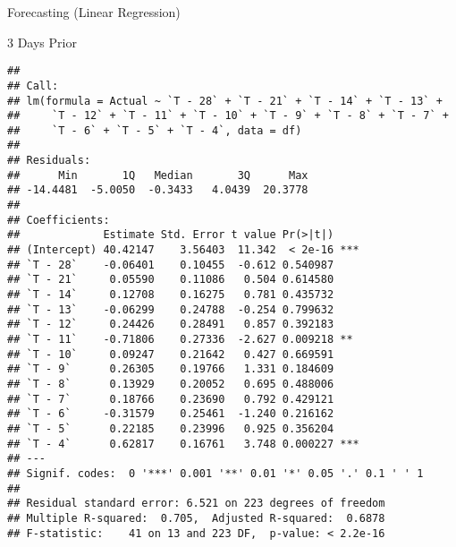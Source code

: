 \documentclass[
  ignorenonframetext,
]{beamer}
\begin{document}
\begin{frame}[fragile]{Forecasting (Linear Regression)}
\begin{block}{3 Days Prior}
\begin{verbatim}
## 
## Call:
## lm(formula = Actual ~ `T - 28` + `T - 21` + `T - 14` + `T - 13` + 
##     `T - 12` + `T - 11` + `T - 10` + `T - 9` + `T - 8` + `T - 7` + 
##     `T - 6` + `T - 5` + `T - 4`, data = df)
## 
## Residuals:
##      Min       1Q   Median       3Q      Max 
## -14.4481  -5.0050  -0.3433   4.0439  20.3778 
## 
## Coefficients:
##             Estimate Std. Error t value Pr(>|t|)    
## (Intercept) 40.42147    3.56403  11.342  < 2e-16 ***
## `T - 28`    -0.06401    0.10455  -0.612 0.540987    
## `T - 21`     0.05590    0.11086   0.504 0.614580    
## `T - 14`     0.12708    0.16275   0.781 0.435732    
## `T - 13`    -0.06299    0.24788  -0.254 0.799632    
## `T - 12`     0.24426    0.28491   0.857 0.392183    
## `T - 11`    -0.71806    0.27336  -2.627 0.009218 ** 
## `T - 10`     0.09247    0.21642   0.427 0.669591    
## `T - 9`      0.26305    0.19766   1.331 0.184609    
## `T - 8`      0.13929    0.20052   0.695 0.488006    
## `T - 7`      0.18766    0.23690   0.792 0.429121    
## `T - 6`     -0.31579    0.25461  -1.240 0.216162    
## `T - 5`      0.22185    0.23996   0.925 0.356204    
## `T - 4`      0.62817    0.16761   3.748 0.000227 ***
## ---
## Signif. codes:  0 '***' 0.001 '**' 0.01 '*' 0.05 '.' 0.1 ' ' 1
## 
## Residual standard error: 6.521 on 223 degrees of freedom
## Multiple R-squared:  0.705,  Adjusted R-squared:  0.6878 
## F-statistic:    41 on 13 and 223 DF,  p-value: < 2.2e-16
\end{verbatim}
\end{block}


\end{frame}
\end{document}
